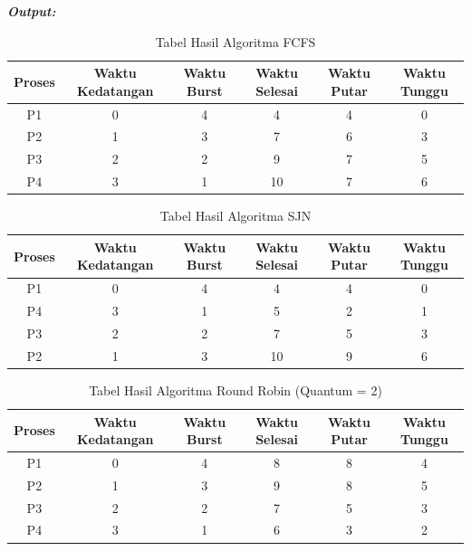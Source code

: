 \documentclass[12pt]{article}
\begin{document}
\textbf{\textit{Output:}}
\begin{table}[h!]
    \centering
    \begin{tabular}{|c|c|c|c|c|c|}
        \hline
        Proses & Waktu Kedatangan & Waktu Burst & Waktu Selesai & Waktu Putar & Waktu Tunggu \\
        \hline
        P1 & 0 & 4 & 4 & 4 & 0 \\
        \hline
        P2 & 1 & 3 & 7 & 6 & 3 \\
        \hline
        P3 & 2 & 2 & 9 & 7 & 5 \\
        \hline
        P4 & 3 & 1 & 10 & 7 & 6 \\
        \hline
    \end{tabular}
    \caption{Tabel Hasil Algoritma FCFS}
\end{table}

\begin{table}[h!]
    \centering
    \begin{tabular}{|c|c|c|c|c|c|}
        \hline
        Proses & Waktu Kedatangan & Waktu Burst & Waktu Selesai & Waktu Putar & Waktu Tunggu \\
        \hline
        P1 & 0 & 4 & 4 & 4 & 0 \\
        \hline
        P4 & 3 & 1 & 5 & 2 & 1 \\
        \hline
        P3 & 2 & 2 & 7 & 5 & 3 \\
        \hline
        P2 & 1 & 3 & 10 & 9 & 6 \\
        \hline
    \end{tabular}
    \caption{Tabel Hasil Algoritma SJN}
\end{table}

\begin{table}[h!]
    \centering
    \begin{tabular}{|c|c|c|c|c|c|}
        \hline
        Proses & Waktu Kedatangan & Waktu Burst & Waktu Selesai & Waktu Putar & Waktu Tunggu \\
        \hline
        P1 & 0 & 4 & 8 & 8 & 4 \\
        \hline
        P2 & 1 & 3 & 9 & 8 & 5 \\
        \hline
        P3 & 2 & 2 & 7 & 5 & 3 \\
        \hline
        P4 & 3 & 1 & 6 & 3 & 2 \\
        \hline
    \end{tabular}
    \caption{Tabel Hasil Algoritma Round Robin (Quantum = 2)}
\end{table}
\end{document}
